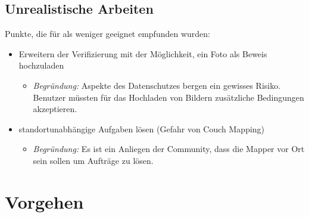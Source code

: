 \subsection{Unrealistische Arbeiten}
Punkte, die für \kort{} als weniger geeignet empfunden wurden:

\begin{itemize}
	\item Erweitern der Verifizierung mit der Möglichkeit, ein Foto als Beweis hochzuladen
	\begin{itemize}
	  \item \emph{Begründung:} Aspekte des Datenschutzes bergen ein gewisses Risiko. Benutzer müssten für das Hochladen von Bildern zusätzliche Bedingungen akzeptieren.
	\end{itemize}
	\item standortunabhängige Aufgaben lösen (Gefahr von Couch Mapping)
	\begin{itemize}
	  \item \emph{Begründung:} Es ist ein Anliegen der  Community, dass die Mapper vor Ort sein sollen um Aufträge zu lösen. 
	\end{itemize}
\end{itemize}

\section{Vorgehen}
\label{pd-weiterentwicklung-vorgehen}

